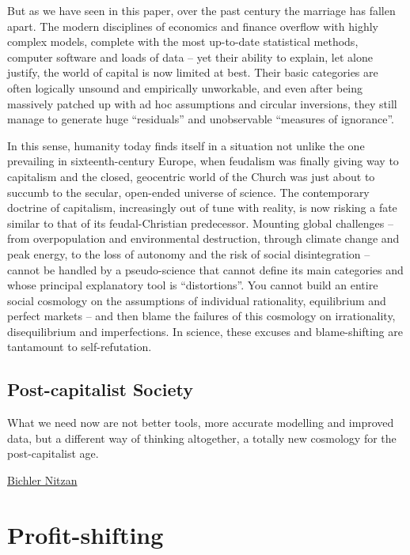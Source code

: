 \documentclass[
]{book}
\begin{document}
But as we have seen in this paper, over the past century the marriage has fallen apart. The modern disciplines of economics and finance overflow with highly complex models, complete with the most up-to-date statistical methods, computer software and loads of data -- yet their ability to explain, let alone justify, the world of capital is now limited at best. Their basic categories are often logically unsound and empirically unworkable, and even after being massively patched up with ad hoc assumptions and circular inversions, they still manage to generate huge ``residuals'' and unobservable ``measures of ignorance''.

In this sense, humanity today finds itself in a situation not unlike the one prevailing in sixteenth-century Europe, when feudalism was finally giving way to capitalism and the closed, geocentric world of the Church was just about to succumb to the secular, open-ended universe of science. The contemporary doctrine of capitalism, increasingly out of tune with reality, is now risking a fate similar to that of its feudal-Christian predecessor. Mounting global challenges -- from overpopulation and environmental destruction, through climate change and peak energy, to the loss of autonomy and the risk of social disintegration -- cannot be handled by a pseudo-science that cannot define its main categories and whose principal explanatory tool is ``distortions''. You cannot build an entire social cosmology on the assumptions of individual rationality, equilibrium and perfect markets -- and then blame the failures of this cosmology on irrationality, disequilibrium and imperfections. In science, these excuses and blame-shifting are tantamount to self-refutation.

\hypertarget{post-capitalist-society}{%
\subsection{Post-capitalist Society}\label{post-capitalist-society}}

What we need now are not better tools, more accurate modelling and improved data, but a different way of thinking altogether, a totally new cosmology for the post-capitalist age.

\href{https://evonomics.com/what-do-economists-mean-when-they-talk-about-capital-accumulation/}{Bichler Nitzan}

\hypertarget{profit-shifting}{%
\section{Profit-shifting}\label{profit-shifting}}
\end{document}
